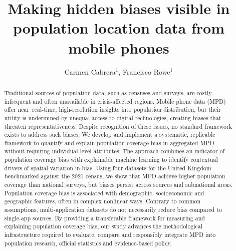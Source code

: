 \documentclass[]{rsos}%
\begin{document}
\title{Making hidden biases visible in population location data from mobile phones}

\author{
Carmen Cabrera$^{1}$,
Francisco Rowe$^{1}$}

\address{
  $^{1}$Geographic Data Science Lab, Department of Geography and Planning, University of Liverpool, Liverpool, United Kingdom.\\
  $^{}$}
\subject{
Mobile phone data,
Human mobility,
Explainable AI,
Spatial analysis}



\begin{abstract}
Traditional sources of population data, such as censuses and surveys, are costly, infrequent and often unavailable in crisis-affected regions. Mobile phone data (MPD) offer near--real-time, high-resolution insights into population distribution, but their utility is undermined by unequal access to digital technologies, creating biases that threaten representativeness. Despite recognition of these issues, no standard framework exists to address such biases. We develop and implement a systematic, replicable framework to quantify and explain population coverage bias in aggregated MPD without requiring individual-level attributes. The approach combines an indicator of population coverage bias with explainable machine learning to identify contextual drivers of spatial variation in bias. Using four datasets for the United Kingdom benchmarked against the 2021 census, we show that MPD achieve higher population coverage than national surveys, but biases persist across sources and subnational areas. Population coverage bias is associated with demographic, socioeconomic and geographic features, often in complex nonlinear ways. Contrary to common assumptions, multi-application datasets do not necessarily reduce bias compared to single-app sources. By providing a transferable framework for measuring and explaining population coverage bias, our study advances the methodological infrastructure required to evaluate, compare and responsibly integrate MPD into population research, official statistics and evidence-based policy.
\end{abstract}
\end{document}
